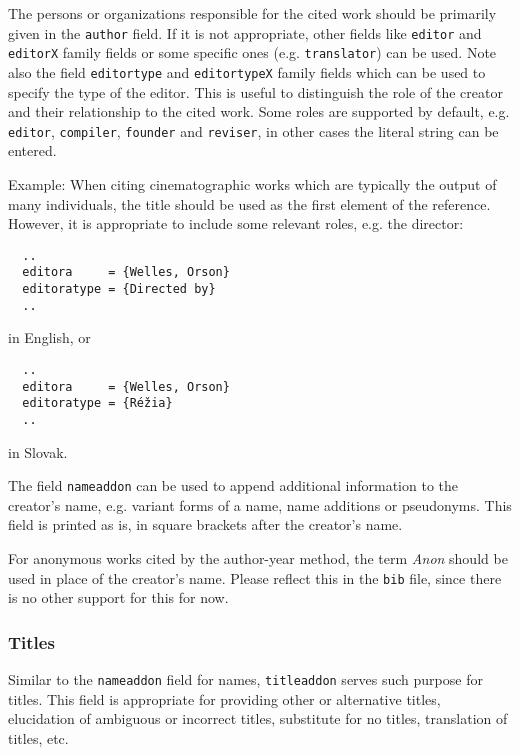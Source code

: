 \documentclass[a4paper,10pt]{ltxdockit}
\def\t|#1|{\texttt{#1}}
\begin{document}
The persons or organizations responsible for the cited work should be
primarily given in the \t|author| field. If it is not appropriate,
other fields like \t|editor| and \t|editorX| family fields or some
specific ones (e.g. \t|translator|) can be used. Note also the field
\t|editortype| and \t|editortypeX| family fields which can be used
to specify the type of the editor. This is useful to distinguish the role
of the creator and their relationship to the cited work. Some roles
are supported by default, e.g. \t|editor|, \t|compiler|, \t|founder|
and \t|reviser|, in other cases the literal string can be entered.

Example:
When citing cinematographic works which are typically the output of many
individuals, the title should be used as the first element of the reference.
However, it is appropriate to include some relevant roles, e.g. the director:

\begin{verbatim}
  ..
  editora     = {Welles, Orson}
  editoratype = {Directed by}
  ..
\end{verbatim}

in English, or

\begin{verbatim}
  ..
  editora     = {Welles, Orson}
  editoratype = {Réžia}
  ..
\end{verbatim}

in Slovak.

The field \t|nameaddon| can be used to append additional information
to the creator's name, e.g. variant forms of a name, name additions
or pseudonyms. This field is printed as is, in square brackets after
the creator's name.

For anonymous works cited by the author-year method, the term \textit{Anon}
should be used in place of the creator's name. Please reflect this
in the \t|bib| file, since there is no other support for this for now.

\subsubsection{Titles}

Similar to the \t|nameaddon| field for names, \t|titleaddon| serves such
purpose for titles. This field is appropriate for providing other or
alternative titles, elucidation of ambiguous or incorrect titles,
substitute for no titles, translation of titles, etc.
\end{document}
